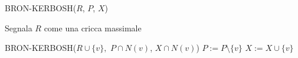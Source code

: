\begin{algorithm}[H]
    \caption{BRON-KERBOSH($R$, $P$, $X$)}\label{alg:bk1}
    \begin{algorithmic}[1]
            \State Segnala $R$ come una cricca massimale
        \Else

                \State BRON-KERBOSH($R \cup \{v\},$ $P \cap N(v)$, $X \cap N(v)$)
                \State $P:= P \setminus \{v\}$
                \State $X:= X \cup \{v\}$
            \EndFor
        \EndIf
    \end{algorithmic}
\end{algorithm}